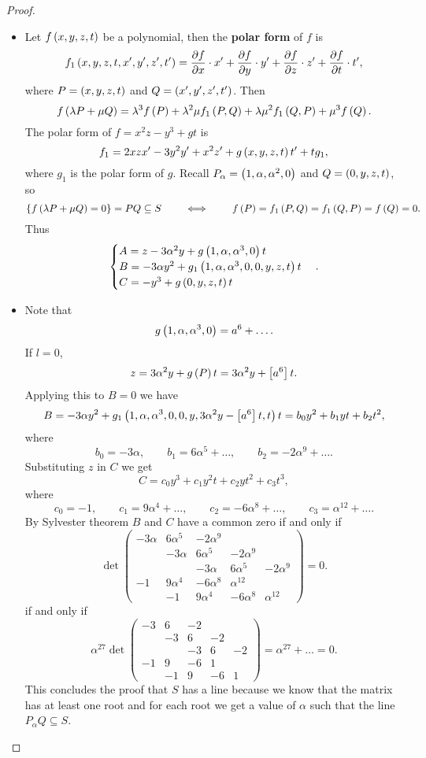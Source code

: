 \begin{proof}
\begin{itemize}
\item Let $ f\left( x, y, z, t \right) $ be a polynomial, then the \textbf{polar form} of $ f $ is
$$ f_1\left( x, y, z, t, x', y', z', t' \right) = \dfrac{\partial f}{\partial x} \cdot x' + \dfrac{\partial f}{\partial y} \cdot y' + \dfrac{\partial f}{\partial z} \cdot z' + \dfrac{\partial f}{\partial t} \cdot t', $$
where $ P = \left( x, y, z, t \right) $ and $ Q = \left( x', y', z', t' \right) $. Then
$$ f\left( \lambda P + \mu Q \right) = \lambda^3f\left( P \right) + \lambda^2\mu f_1\left( P, Q \right) + \lambda\mu^2f_1\left( Q, P \right) + \mu^3f\left( Q \right). $$
The polar form of $ f = x^2z - y^3 + gt $ is
$$ f_1 = 2xzx' - 3y^2y' + x^2z' + g\left( x, y, z, t \right)t' + tg_1, $$
where $ g_1 $ is the polar form of $ g $. Recall $ P_\alpha = \left( 1, \alpha, \alpha^2, 0 \right) $ and $ Q = \left( 0, y, z, t \right) $, so
$$ \left\{ f\left( \lambda P + \mu Q \right) = 0 \right\} = PQ \subseteq S \qquad \iff \qquad f\left( P \right) = f_1\left( P, Q \right) = f_1\left( Q, P \right) = f\left( Q \right) = 0. $$
Thus
$$
\begin{cases}
A = z - 3\alpha^2y + g\left( 1, \alpha, \alpha^3, 0 \right)t \\
B = -3\alpha y^2 + g_1\left( 1, \alpha, \alpha^3, 0, 0, y, z, t \right)t \\
C = -y^3 + g\left( 0, y, z, t \right)t
\end{cases}.
$$
\item Note that
$$ g\left( 1, \alpha, \alpha^3, 0 \right) = a^6 + \dots. $$
If $ l = 0 $,
$$ z = 3\alpha^2y + g\left( P \right)t = 3\alpha^2y + \left[ a^6 \right]t. $$
Applying this to $ B = 0 $ we have
$$ B = -3\alpha y^2 + g_1\left( 1, \alpha, \alpha^3, 0, 0, y, 3\alpha^2y - \left[ a^6 \right]t, t \right)t = b_0y^2 + b_1yt + b_2t^2, $$
where
$$ b_0 = -3\alpha, \qquad b_1 = 6\alpha^5 + \dots, \qquad b_2 = -2\alpha^9 + \dots. $$
Substituting $ z $ in $ C $ we get
$$ C = c_0y^3 + c_1y^2t + c_2yt^2 + c_3t^3, $$
where
$$ c_0 = -1, \qquad c_1 = 9\alpha^4 + \dots, \qquad c_2 = -6\alpha^8 + \dots, \qquad c_3 = \alpha^{12} + \dots. $$
By Sylvester theorem $ B $ and $ C $ have a common zero if and only if
$$ \det
\begin{pmatrix}
-3\alpha & 6\alpha^5 & -2\alpha^9 & & \\
& -3\alpha & 6\alpha^5 & -2\alpha^9 & \\
& & -3\alpha & 6\alpha^5 & -2\alpha^9 \\
-1 & 9\alpha^4 & -6\alpha^8 & \alpha^{12} & \\
& -1 & 9\alpha^4 & -6\alpha^8 & \alpha^{12}
\end{pmatrix}
= 0. $$
if and only if
$$ \alpha^{27}\det
\begin{pmatrix}
-3 & 6 & -2 & & \\
& -3 & 6 & -2 & \\
& & -3 & 6 & -2 \\
-1 & 9 & -6 & 1 & \\
& -1 & 9 & -6 & 1
\end{pmatrix}
= \alpha^{27} + \dots = 0. $$
This concludes the proof that $ S $ has a line because we know that the matrix has at least one root and for each root we get a value of $ \alpha $ such that the line $ P_\alpha Q \subseteq S $.
\end{itemize}
\end{proof}

